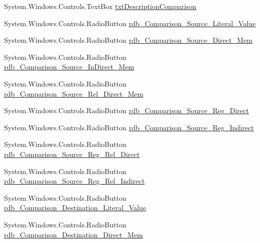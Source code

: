 \begin{DoxyCompactItemize}
\item 
System.\+Windows.\+Controls.\+Text\+Box \hyperlink{class_c_p_u___o_s___simulator_1_1_instructions_window_a1ac2050428b5ece7f1f6791771e9cef6}{txt\+Description\+Comparison}
\item 
System.\+Windows.\+Controls.\+Radio\+Button \hyperlink{class_c_p_u___o_s___simulator_1_1_instructions_window_a13ccbc8463b47928aad32eeb9671e0b0}{rdb\+\_\+\+Comparison\+\_\+\+Source\+\_\+\+Literal\+\_\+\+Value}
\item 
System.\+Windows.\+Controls.\+Radio\+Button \hyperlink{class_c_p_u___o_s___simulator_1_1_instructions_window_a46e62ecbee93e4c6177a637828f112e4}{rdb\+\_\+\+Comparison\+\_\+\+Source\+\_\+\+Direct\+\_\+\+Mem}
\item 
System.\+Windows.\+Controls.\+Radio\+Button \hyperlink{class_c_p_u___o_s___simulator_1_1_instructions_window_a3197d2e01bad67f1f1fa2d92778b6a98}{rdb\+\_\+\+Comparison\+\_\+\+Source\+\_\+\+In\+Direct\+\_\+\+Mem}
\item 
System.\+Windows.\+Controls.\+Radio\+Button \hyperlink{class_c_p_u___o_s___simulator_1_1_instructions_window_a5acb728f287ab344915eed774a9dfab9}{rdb\+\_\+\+Comparison\+\_\+\+Source\+\_\+\+Rel\+\_\+\+Direct\+\_\+\+Mem}
\item 
System.\+Windows.\+Controls.\+Radio\+Button \hyperlink{class_c_p_u___o_s___simulator_1_1_instructions_window_a27c58c45fc99e7b95b09663b0cc4d05b}{rdb\+\_\+\+Comparison\+\_\+\+Source\+\_\+\+Reg\+\_\+\+Direct}
\item 
System.\+Windows.\+Controls.\+Radio\+Button \hyperlink{class_c_p_u___o_s___simulator_1_1_instructions_window_a9cb550ce68237a73f1110693a2126aa6}{rdb\+\_\+\+Comparison\+\_\+\+Source\+\_\+\+Reg\+\_\+\+Indirect}
\item 
System.\+Windows.\+Controls.\+Radio\+Button \hyperlink{class_c_p_u___o_s___simulator_1_1_instructions_window_a6bbc9128988b5d1aaa738ed49370e113}{rdb\+\_\+\+Comparison\+\_\+\+Source\+\_\+\+Reg\+\_\+\+Rel\+\_\+\+Direct}
\item 
System.\+Windows.\+Controls.\+Radio\+Button \hyperlink{class_c_p_u___o_s___simulator_1_1_instructions_window_acabf2f67eda22ab469f5bc753c783488}{rdb\+\_\+\+Comparison\+\_\+\+Source\+\_\+\+Reg\+\_\+\+Rel\+\_\+\+Indirect}
\item 
System.\+Windows.\+Controls.\+Radio\+Button \hyperlink{class_c_p_u___o_s___simulator_1_1_instructions_window_a6040fe832dd344fbdc892583b4619afb}{rdb\+\_\+\+Comparison\+\_\+\+Destination\+\_\+\+Literal\+\_\+\+Value}
\item 
System.\+Windows.\+Controls.\+Radio\+Button \hyperlink{class_c_p_u___o_s___simulator_1_1_instructions_window_a5d179d7a7a6b8a9c407d5112a0c2bad6}{rdb\+\_\+\+Comparison\+\_\+\+Destination\+\_\+\+Direct\+\_\+\+Mem}

\end{DoxyCompactItemize}
